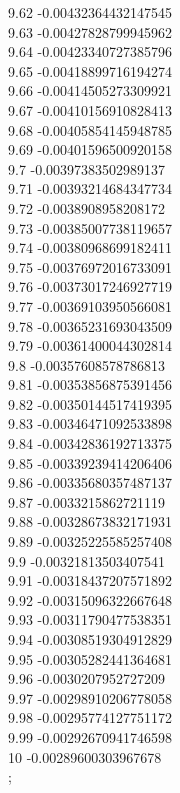 {9.62	-0.00432364432147545\\
9.63	-0.00427828799945962\\
9.64	-0.00423340727385796\\
9.65	-0.00418899716194274\\
9.66	-0.00414505273309921\\
9.67	-0.00410156910828413\\
9.68	-0.00405854145948785\\
9.69	-0.00401596500920158\\
9.7	-0.00397383502989137\\
9.71	-0.00393214684347734\\
9.72	-0.0038908958208172\\
9.73	-0.00385007738119657\\
9.74	-0.00380968699182411\\
9.75	-0.00376972016733091\\
9.76	-0.00373017246927719\\
9.77	-0.00369103950566081\\
9.78	-0.00365231693043509\\
9.79	-0.00361400044302814\\
9.8	-0.00357608578786813\\
9.81	-0.00353856875391456\\
9.82	-0.00350144517419395\\
9.83	-0.00346471092533898\\
9.84	-0.00342836192713375\\
9.85	-0.00339239414206406\\
9.86	-0.00335680357487137\\
9.87	-0.0033215862721119\\
9.88	-0.00328673832171931\\
9.89	-0.00325225585257408\\
9.9	-0.00321813503407541\\
9.91	-0.00318437207571892\\
9.92	-0.00315096322667648\\
9.93	-0.00311790477538351\\
9.94	-0.00308519304912829\\
9.95	-0.00305282441364681\\
9.96	-0.0030207952727209\\
9.97	-0.00298910206778058\\
9.98	-0.00295774127751172\\
9.99	-0.00292670941746598\\
10	-0.00289600303967678\\
};